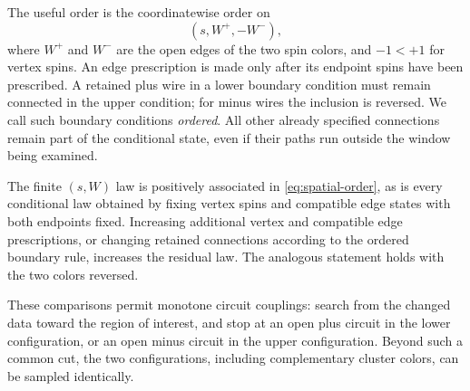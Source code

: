 The useful order is the coordinatewise order on
\begin{equation}\label{eq:spatial-order}
       (s,W^+,-W^-),
\end{equation}
where $W^+$ and $W^-$ are the open edges of the two spin colors, and
$-1<+1$ for vertex spins. An edge prescription is made only after its
endpoint spins have been prescribed. A retained plus wire in a lower
boundary condition must remain connected in the upper condition;
for minus wires the inclusion is reversed. We call such boundary
conditions \emph{ordered}. All other already specified connections
remain part of the conditional state, even if their paths run outside
the window being examined.

\begin{proposition}
\label{prop:comparison}
The finite $(s,W)$ law is positively associated in
\eqref{eq:spatial-order}, as is every conditional law obtained by fixing
vertex spins and compatible edge states with both endpoints fixed.
Increasing additional vertex and compatible edge prescriptions, or
changing retained connections according to the ordered boundary rule,
increases the residual law. The analogous statement holds with the two
colors reversed.

These comparisons permit monotone circuit couplings: search from the
changed data toward the region of interest, and stop at an open plus
circuit in the lower configuration, or an open minus circuit in the
upper configuration. Beyond such a common cut, the two configurations,
including complementary cluster colors, can be sampled identically.
\end{proposition}

